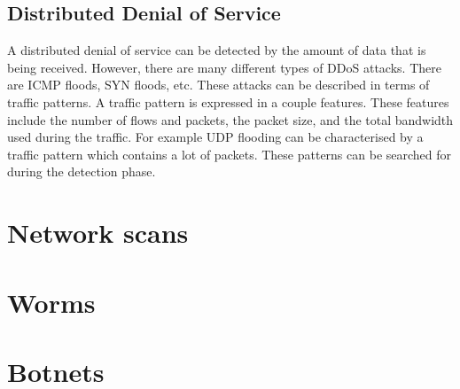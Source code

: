 \subsection{Distributed Denial of Service}
A distributed denial of service can be detected by the amount of data that is being received. However, there are many different types of DDoS attacks. There are ICMP floods, SYN floods, etc. These attacks can be described in terms of traffic patterns. A traffic pattern is expressed in a couple features. These features include the number of flows and packets, the packet size, and the total bandwidth used during the traffic. For example UDP flooding can be characterised by a traffic pattern which contains a lot of packets. These patterns can be searched for during the detection phase. \cite{kim2004flow}
\section{Network scans}

\section{Worms}

\section{Botnets}

